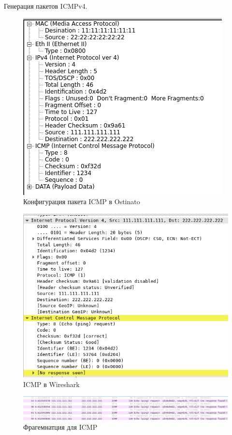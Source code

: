 \documentclass[12pt, a4paper] {ncc}
\begin{document}
	Генерация пакетов ICMPv4.  \\
	\begin{figure}[h!]
		\includegraphics[scale=0.5]{ICMPStream_without_frag.png}
		\caption{Конфигурация пакета ICMP в Ostinato}
		\center
	\end{figure}

	\begin{figure}[h!]
		\includegraphics[scale=0.4]{CapturedICMP.png}
		\caption{ICMP в Wireshark}
		\center
	\end{figure}
	\begin{figure}[h!]
		\includegraphics[scale=0.4]{./ICMPFrag.png}
		\caption{Фрагемнатция для ICMP}
		\center
	\end{figure}
\end{document}
